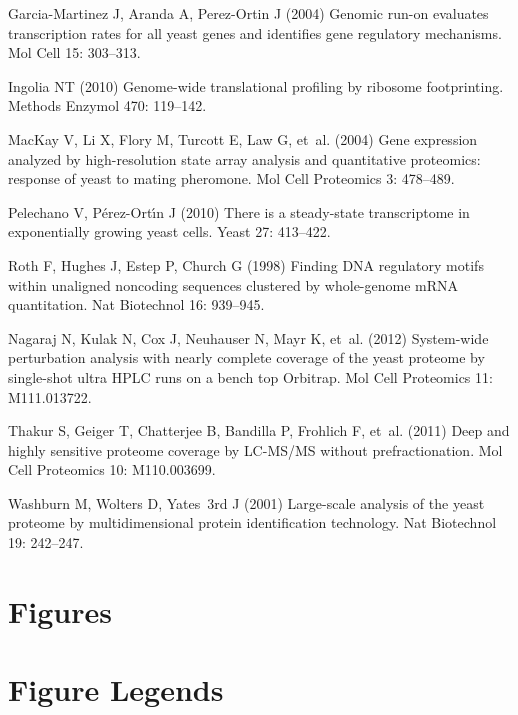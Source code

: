 \documentclass[10pt]{article}
\begin{document}
\begin{thebibliography}{10}
Garcia-Martinez J, Aranda A, Perez-Ortin J (2004) Genomic run-on evaluates
  transcription rates for all yeast genes and identifies gene regulatory
  mechanisms.
\newblock Mol Cell 15: 303--313.

Ingolia NT (2010) {Genome-wide translational profiling by ribosome
  footprinting}.
\newblock Methods Enzymol 470: 119--142.

MacKay V, Li X, Flory M, Turcott E, Law G, et~al. (2004) Gene expression
  analyzed by high-resolution state array analysis and quantitative proteomics:
  response of yeast to mating pheromone.
\newblock Mol Cell Proteomics 3: 478--489.

Pelechano V, P\'erez-Ort\'{\i}n J (2010) There is a steady-state transcriptome
  in exponentially growing yeast cells.
\newblock Yeast 27: 413--422.

Roth F, Hughes J, Estep P, Church G (1998) Finding {DNA} regulatory motifs
  within unaligned noncoding sequences clustered by whole-genome {mRNA}
  quantitation.
\newblock Nat Biotechnol 16: 939--945.

Nagaraj N, Kulak N, Cox J, Neuhauser N, Mayr K, et~al. (2012) System-wide
  perturbation analysis with nearly complete coverage of the yeast proteome by
  single-shot ultra {HPLC} runs on a bench top {O}rbitrap.
\newblock Mol Cell Proteomics 11: M111.013722.

Thakur S, Geiger T, Chatterjee B, Bandilla P, Frohlich F, et~al. (2011) Deep
  and highly sensitive proteome coverage by {LC-MS/MS} without
  prefractionation.
\newblock Mol Cell Proteomics 10: M110.003699.

Washburn M, Wolters D, Yates~3rd J (2001) Large-scale analysis of the yeast
  proteome by multidimensional protein identification technology.
\newblock Nat Biotechnol 19: 242--247.

\end{thebibliography}

 {
	\section*{Figures}
}{
	\section*{Figure Legends}
}
\end{document}
